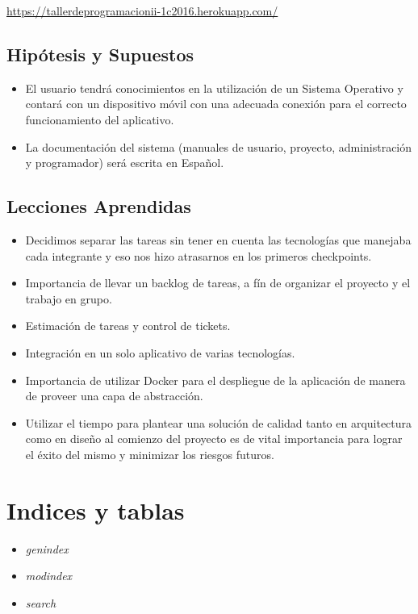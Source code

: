 \documentclass[letterpaper,10pt,english]{sphinxmanual}
\begin{document}
\href{https://tallerdeprogramacionii-1c2016.herokuapp.com/}{https://tallerdeprogramacionii-1c2016.herokuapp.com/}


\section{Hipótesis y Supuestos}
\label{manuals:hipotesis-y-supuestos}\begin{itemize}
\item {} 
El usuario tendrá conocimientos en la utilización de un Sistema Operativo y contará con un dispositivo móvil con una adecuada conexión para el correcto funcionamiento del aplicativo.

\item {} 
La documentación del sistema (manuales de usuario, proyecto, administración y programador) será escrita en Español.

\end{itemize}


\section{Lecciones Aprendidas}
\label{manuals:lecciones-aprendidas}\begin{itemize}
\item {} 
Decidimos separar las tareas sin tener en cuenta las tecnologías que manejaba cada integrante y eso nos hizo atrasarnos en los primeros checkpoints.

\item {} 
Importancia de llevar un backlog de tareas, a fín de organizar el proyecto y el trabajo en grupo.

\item {} 
Estimación de tareas y control de tickets.

\item {} 
Integración en un solo aplicativo de varias tecnologías.

\item {} 
Importancia de utilizar Docker para el despliegue de la aplicación de manera de proveer una capa de abstracción.

\item {} 
Utilizar el tiempo para plantear una solución de calidad tanto en arquitectura como en diseño al comienzo del proyecto es de vital importancia para lograr el éxito del mismo y minimizar los riesgos futuros.

\end{itemize}


\chapter{Indices y tablas}
\label{index:indices-y-tablas}\begin{itemize}
\item {} 
\emph{genindex}

\item {} 
\emph{modindex}

\item {} 
\emph{search}

\end{itemize}



\renewcommand{\indexname}{Index}
\printindex
\end{document}
